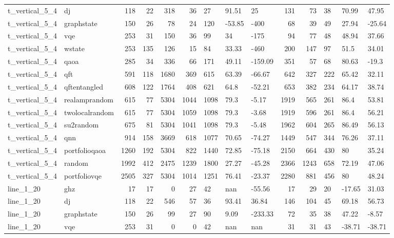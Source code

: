\begin{longtable}{llrrrrlllrrlll}
t\_vertical\_5\_4 & dj & 118 & 22 & 318 & 36 & 27 & 91.51 & 25 & 131 & 73 & 38 & 70.99 & 47.95 \\
t\_vertical\_5\_4 & graphstate & 150 & 26 & 78 & 24 & 120 & -53.85 & -400 & 68 & 39 & 49 & 27.94 & -25.64 \\
t\_vertical\_5\_4 & vqe & 253 & 31 & 150 & 36 & 99 & 34 & -175 & 94 & 77 & 48 & 48.94 & 37.66 \\
t\_vertical\_5\_4 & wstate & 253 & 135 & 126 & 15 & 84 & 33.33 & -460 & 200 & 147 & 97 & 51.5 & 34.01 \\
t\_vertical\_5\_4 & qaoa & 285 & 34 & 336 & 66 & 171 & 49.11 & -159.09 & 351 & 57 & 68 & 80.63 & -19.3 \\
t\_vertical\_5\_4 & qft & 591 & 118 & 1680 & 369 & 615 & 63.39 & -66.67 & 642 & 327 & 222 & 65.42 & 32.11 \\
t\_vertical\_5\_4 & qftentangled & 608 & 122 & 1764 & 408 & 621 & 64.8 & -52.21 & 653 & 382 & 234 & 64.17 & 38.74 \\
t\_vertical\_5\_4 & realamprandom & 615 & 77 & 5304 & 1044 & 1098 & 79.3 & -5.17 & 1919 & 565 & 261 & 86.4 & 53.81 \\
t\_vertical\_5\_4 & twolocalrandom & 615 & 77 & 5304 & 1059 & 1098 & 79.3 & -3.68 & 1919 & 596 & 261 & 86.4 & 56.21 \\
t\_vertical\_5\_4 & su2random & 675 & 81 & 5304 & 1041 & 1098 & 79.3 & -5.48 & 1962 & 604 & 265 & 86.49 & 56.13 \\
t\_vertical\_5\_4 & qnn & 914 & 158 & 3669 & 618 & 1077 & 70.65 & -74.27 & 1449 & 547 & 344 & 76.26 & 37.11 \\
t\_vertical\_5\_4 & portfolioqaoa & 1260 & 192 & 5304 & 822 & 1440 & 72.85 & -75.18 & 2150 & 664 & 430 & 80 & 35.24 \\
t\_vertical\_5\_4 & random & 1992 & 412 & 2475 & 1239 & 1800 & 27.27 & -45.28 & 2366 & 1243 & 658 & 72.19 & 47.06 \\
t\_vertical\_5\_4 & portfoliovqe & 2505 & 327 & 5304 & 1014 & 1251 & 76.41 & -23.37 & 2280 & 881 & 456 & 80 & 48.24 \\
line\_1\_20 & ghz & 17 & 17 & 0 & 27 & 42 & nan & -55.56 & 17 & 29 & 20 & -17.65 & 31.03 \\
line\_1\_20 & dj & 118 & 22 & 546 & 57 & 36 & 93.41 & 36.84 & 146 & 104 & 45 & 69.18 & 56.73 \\
line\_1\_20 & graphstate & 150 & 26 & 99 & 27 & 90 & 9.09 & -233.33 & 72 & 35 & 38 & 47.22 & -8.57 \\
line\_1\_20 & vqe & 253 & 31 & 0 & 0 & 42 & nan & nan & 31 & 31 & 43 & -38.71 & -38.71 \\

\end{longtable}
